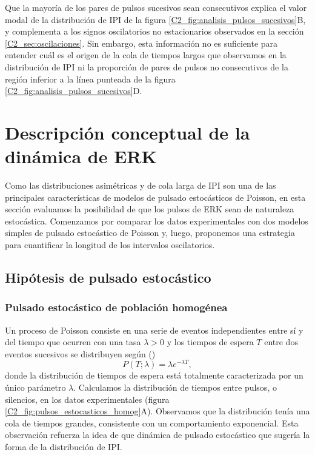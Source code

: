 \documentclass[./main.tex]{subfiles}
\begin{document}
Que la mayoría de los pares de pulsos sucesivos sean consecutivos explica el valor modal de la distribución de IPI de la figura \ref{C2_fig:analisis_pulsos_sucesivos}B, y complementa a los signos oscilatorios no estacionarios observados en la sección \ref{C2_sec:oscilaciones}. Sin embargo, esta información no es suficiente para entender cuál es el origen de la cola de tiempos largos que observamos en la distribución de IPI ni la proporción de pares de pulsos no consecutivos de la región inferior a la línea punteada de la figura \ref{C2_fig:analisis_pulsos_sucesivos}D.


\section{Descripción conceptual de la dinámica de ERK}
\label{C2_sec:pulsado_estoctastico}

Como las distribuciones asimétricas y de cola larga de IPI son una de las principales características de modelos de pulsado estocásticos de Poisson, en esta sección evaluamos la posibilidad de que los pulsos de ERK sean de naturaleza estocástica. Comenzamos por comparar los datos experimentales con dos modelos simples de pulsado estocástico de Poisson y, luego, proponemos una estrategia para cuantificar la longitud de los intervalos oscilatorios. 


\subsection{Hipótesis de pulsado estocástico}
\subsubsection*{Pulsado estocástico de población homogénea}

Un proceso de Poisson consiste en una serie de eventos independientes entre sí y del tiempo que ocurren con una tasa $\lambda > 0$ y los tiempos de espera $T$ entre dos eventos sucesivos se distribuyen según (\cite{TimeSeries1972,Levine2013})
\begin{equation}
    P(T;\lambda) = \lambda e^{-\lambda T},
\end{equation}
donde la distribución de tiempos de espera está totalmente caracterizada por un único parámetro $\lambda$. Calculamos la distribución de tiempos entre pulsos, o silencios, en los datos experimentales (figura \ref{C2_fig:pulsos_estocasticos_homog}A). Observamos que la distribución tenía una cola de tiempos grandes, consistente con un comportamiento exponencial. Esta observación refuerza la idea de que dinámica de pulsado estocástico que sugería la forma de la distribución de IPI. 
\end{document}
